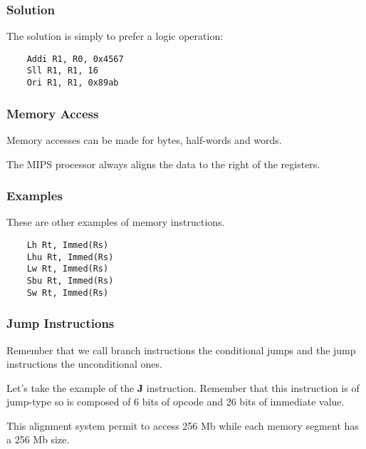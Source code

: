 
\begin{frame}[containsverbatim]
  \frametitle{Solution}

  The solution is simply to prefer a logic operation:

  \begin{verbatim}
    Addi R1, R0, 0x4567
    Sll R1, R1, 16
    Ori R1, R1, 0x89ab
  \end{verbatim}
\end{frame}


\begin{frame}
  \frametitle{Memory Access}

  Memory accesses can be made for bytes, half-words and words.

  \-

  The MIPS processor always aligns the data to the right of the registers.

  \begin{center}
  \end{center}
\end{frame}


\begin{frame}[containsverbatim]
  \frametitle{Examples}

  These are other examples of memory instructions.

  \begin{verbatim}
    Lh Rt, Immed(Rs)
    Lhu Rt, Immed(Rs)
    Lw Rt, Immed(Rs)
    Sbu Rt, Immed(Rs)
    Sw Rt, Immed(Rs)
  \end{verbatim}
\end{frame}


\begin{frame}
  \frametitle{Jump Instructions}

  Remember that we call branch instructions the conditional jumps
  and the jump instructions the unconditional ones.

  \-

  Let's take the example of the \textbf{J} instruction. Remember that
  this instruction is of jump-type so is composed of 6 bits of opcode
  and 26 bits of immediate value.

  \begin{center}
  \end{center}

  This alignment system permit to access 256 Mb while each memory segment
  has a 256 Mb size.
\end{frame}

